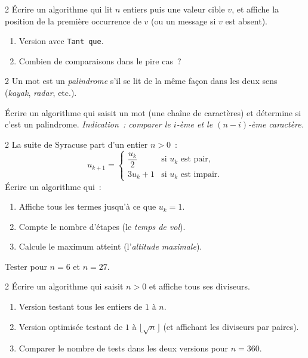 \begin{exo}{2}
\'Ecrire un algorithme qui lit $n$ entiers puis une valeur cible $v$,
et affiche la position de la premi\`ere occurrence de $v$
(ou un message si $v$ est absent).
\begin{enumerate}
  \item Version avec \texttt{Tant que}.
  \item Combien de comparaisons dans le pire cas~?
\end{enumerate}
\end{exo}

\begin{exo}{2}
Un mot est un \emph{palindrome} s'il se lit de la m\^eme fa\c con dans
les deux sens (\og \textit{kayak}\fg, \og \textit{radar}\fg, etc.).

\'Ecrire un algorithme qui saisit un mot (une cha\^ine de caract\`eres)
et d\'etermine si c'est un palindrome.
\emph{Indication~: comparer le $i$-\`eme et le $(n-i)$-\`eme caract\`ere.}
\end{exo}

\begin{exo}{2}
La suite de Syracuse part d'un entier $n > 0$~:
\[ u_{k+1} = \begin{cases} \dfrac{u_k}{2} & \text{si } u_k \text{ est pair,} \\
3u_k + 1 & \text{si } u_k \text{ est impair.}\end{cases} \]
\'Ecrire un algorithme qui~:
\begin{enumerate}
  \item Affiche tous les termes jusqu'\`a ce que $u_k = 1$.
  \item Compte le nombre d'\'etapes (le \emph{temps de vol}).
  \item Calcule le maximum atteint (l'\emph{altitude maximale}).
\end{enumerate}
Tester pour $n = 6$ et $n = 27$.
\end{exo}

\begin{exo}{2}
\'Ecrire un algorithme qui saisit $n > 0$ et affiche tous ses diviseurs.
\begin{enumerate}
  \item Version testant tous les entiers de $1$ \`a $n$.
  \item Version optimis\'ee testant de $1$ \`a $\lfloor\sqrt{n}\rfloor$
        (et affichant les diviseurs par paires).
  \item Comparer le nombre de tests dans les deux versions pour $n=360$.
\end{enumerate}
\end{exo}

